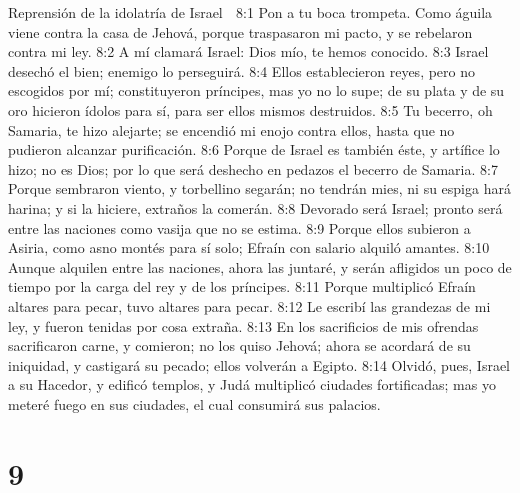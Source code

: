 Reprensión de la idolatría de Israel  

8:1 Pon a tu boca trompeta. Como águila viene contra la casa de Jehová, porque traspasaron mi pacto, y se rebelaron contra mi ley.  
8:2 A mí clamará Israel: Dios mío, te hemos conocido.  
8:3 Israel desechó el bien; enemigo lo perseguirá.  
8:4 Ellos establecieron reyes, pero no escogidos por mí; constituyeron príncipes, mas yo no lo supe; de su plata y de su oro hicieron ídolos para sí, para ser ellos mismos destruidos.  
8:5 Tu becerro, oh Samaria, te hizo alejarte; se encendió mi enojo contra ellos, hasta que no pudieron alcanzar purificación.  
8:6 Porque de Israel es también éste, y artífice lo hizo; no es Dios; por lo que será deshecho en pedazos el becerro de Samaria.  
8:7 Porque sembraron viento, y torbellino segarán; no tendrán mies, ni su espiga hará harina; y si la hiciere, extraños la comerán.  
8:8 Devorado será Israel; pronto será entre las naciones como vasija que no se estima.  
8:9 Porque ellos subieron a Asiria, como asno montés para sí solo; Efraín con salario alquiló amantes.  
8:10 Aunque alquilen entre las naciones, ahora las juntaré, y serán afligidos un poco de tiempo por la carga del rey y de los príncipes.  
8:11 Porque multiplicó Efraín altares para pecar, tuvo altares para pecar.  
8:12 Le escribí las grandezas de mi ley, y fueron tenidas por cosa extraña.  
8:13 En los sacrificios de mis ofrendas sacrificaron carne, y comieron; no los quiso Jehová; ahora se acordará de su iniquidad, y castigará su pecado; ellos volverán a Egipto.  
8:14 Olvidó, pues, Israel a su Hacedor, y edificó templos, y Judá multiplicó ciudades fortificadas; mas yo meteré fuego en sus ciudades, el cual consumirá sus palacios.  

\chapter{9}

